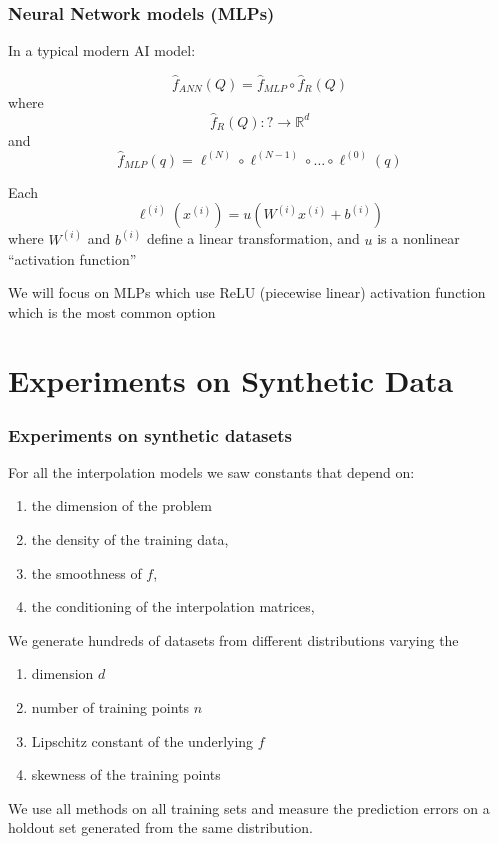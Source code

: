 \documentclass[aspectratio=169]{beamer}
\begin{document}
\begin{frame}
\frametitle{Neural Network models (MLPs)}

    In a typical modern AI model:

    $${\hat f}_{ANN}(Q) = {\hat f}_{MLP} \circ {\hat f}_R(Q)$$
    where
    $${\hat f}_R(Q) : ? \rightarrow \mathbb{R}^d$$
    and
    $$
    {\hat f}_{MLP}(q) =
        \ell^{(N)} \circ \ell^{(N-1)} \circ \ldots \circ \ell^{(0)}(q)
    $$

    Each
    $$
    \ell^{(i)}(x^{(i)}) = u\left(W^{(i)}x^{(i)} + b^{(i)}\right)
    $$
    where $W^{(i)}$ and $b^{(i)}$ define a linear transformation, and $u$ is a
    nonlinear ``activation function''

    \bigskip

    We will focus on MLPs which use ReLU (piecewise linear) activation function
    which is the most common option
\end{frame}

\section{Experiments on Synthetic Data}

\begin{frame}
\frametitle{Experiments on synthetic datasets}
    For all the interpolation models we saw constants that depend on:
    \begin{enumerate}
        \item the dimension of the problem
        \item the density of the training data,
        \item the smoothness of $f$,
        \item the conditioning of the interpolation matrices,
    \end{enumerate}

    \medskip

    We generate hundreds of datasets from different distributions varying the
    \begin{enumerate}
        \item dimension $d$
        \item number of training points $n$
        \item Lipschitz constant of the underlying $f$
        \item skewness of the training points
    \end{enumerate}

    \medskip

    We use all methods on all training sets and measure the prediction
    errors on a holdout set generated from the same distribution.
\end{frame}
\end{document}
